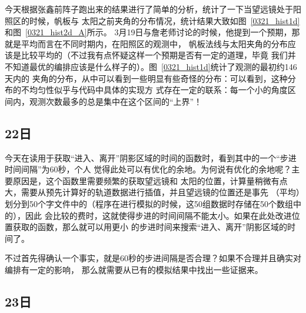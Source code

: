 今天根据张鑫前阵子跑出来的结果进行了简单的分析，统计了一下当望远镜处于阳照区的时候，帆板与
太阳之前夹角的分布情况，统计结果大致如图~\ref{0321_hist1d}和图~\ref{0321_hist2d_A}所示。
3月19日与詹老师讨论的时候，他提到一个预期，那就是平均而言在不同时期内，在阳照区的观测中，
帆板法线与太阳夹角的分布应该是比较平均的（不过我有点怀疑这样一个预期是否有一定的道理，毕竟
我们并不知道最优的编排应该是什么样子的）。图~\ref{0321_hist1d}统计了观测的最初约146天内的
夹角的分布，从中可以看到一些明显有些奇怪的分布：可以看到，这种分布的不均匀性似乎与代码中具体的实现方
式存在一定的联系：每一个小的角度区间内，观测次数最多的总是集中在这个区间的“上界”！




\subsection{22日}
今天在读用于获取“进入、离开”阴影区域的时间的函数时，看到其中的一个“步进时间间隔”为60秒，个人
觉得此处可以有优化的余地。为何说有优化的余地呢？主要原因是，这个函数里需要频繁的获取望远镜和
太阳的位置，计算量稍微有点大，需要从预先计算好的轨道数据进行插值，并且望远镜的位置还是事先
（平均）划分到50个字文件中的（程序在进行模拟的时候，这50组数据时存储在50个数组中的），因此
会比较的费时，这就使得步进的时间间隔不能太小。如果在此处改进位置获取的函数，那么就可以用更小
的步进时间来搜索“进入、离开”阴影区域的时间了。

不过首先得确认一个事实，就是60秒的步进间隔是否合理？如果不合理并且确实对编排有一定的影响，
那么就需要从已有的模拟结果中找出一些证据来。


\subsection{23日}


